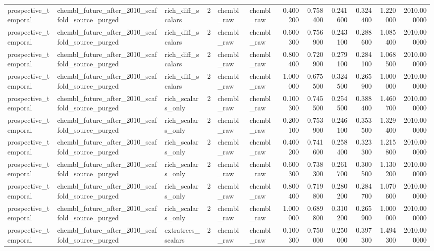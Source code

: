 \begin{longtable}{lllrllrrrrrr}
prospective\_temporal & chembl\_future\_after\_2010\_scaffold\_source\_purged & rich\_diff\_scalars & 2 & chembl\_raw & chembl\_raw & 0.400200 & 0.758400 & 0.241600 & 0.324400 & 1.220000 & 2010.000000 \\
prospective\_temporal & chembl\_future\_after\_2010\_scaffold\_source\_purged & rich\_diff\_scalars & 2 & chembl\_raw & chembl\_raw & 0.600300 & 0.756900 & 0.243100 & 0.288600 & 1.085400 & 2010.000000 \\
prospective\_temporal & chembl\_future\_after\_2010\_scaffold\_source\_purged & rich\_diff\_scalars & 2 & chembl\_raw & chembl\_raw & 0.800400 & 0.720900 & 0.279100 & 0.284100 & 1.068500 & 2010.000000 \\
prospective\_temporal & chembl\_future\_after\_2010\_scaffold\_source\_purged & rich\_diff\_scalars & 2 & chembl\_raw & chembl\_raw & 1.000000 & 0.675500 & 0.324500 & 0.265900 & 1.000000 & 2010.000000 \\
prospective\_temporal & chembl\_future\_after\_2010\_scaffold\_source\_purged & rich\_scalars\_only & 2 & chembl\_raw & chembl\_raw & 0.100300 & 0.745500 & 0.254500 & 0.388400 & 1.460700 & 2010.000000 \\
prospective\_temporal & chembl\_future\_after\_2010\_scaffold\_source\_purged & rich\_scalars\_only & 2 & chembl\_raw & chembl\_raw & 0.200100 & 0.753900 & 0.246100 & 0.353500 & 1.329400 & 2010.000000 \\
prospective\_temporal & chembl\_future\_after\_2010\_scaffold\_source\_purged & rich\_scalars\_only & 2 & chembl\_raw & chembl\_raw & 0.400200 & 0.741600 & 0.258400 & 0.323300 & 1.215800 & 2010.000000 \\
prospective\_temporal & chembl\_future\_after\_2010\_scaffold\_source\_purged & rich\_scalars\_only & 2 & chembl\_raw & chembl\_raw & 0.600300 & 0.738300 & 0.261700 & 0.300500 & 1.130200 & 2010.000000 \\
prospective\_temporal & chembl\_future\_after\_2010\_scaffold\_source\_purged & rich\_scalars\_only & 2 & chembl\_raw & chembl\_raw & 0.800400 & 0.719800 & 0.280200 & 0.284700 & 1.070600 & 2010.000000 \\
prospective\_temporal & chembl\_future\_after\_2010\_scaffold\_source\_purged & rich\_scalars\_only & 2 & chembl\_raw & chembl\_raw & 1.000000 & 0.689800 & 0.310200 & 0.265900 & 1.000000 & 2010.000000 \\
prospective\_temporal & chembl\_future\_after\_2010\_scaffold\_source\_purged & extratrees\_scalars & 2 & chembl\_raw & chembl\_raw & 0.100300 & 0.750000 & 0.250000 & 0.397300 & 1.494300 & 2010.000000 \\

\end{longtable}

